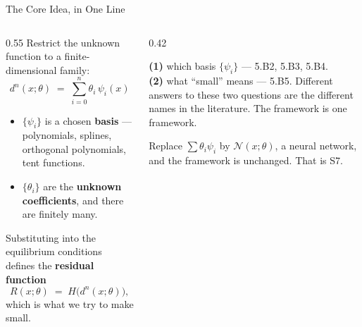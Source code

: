 \begin{frame}{The Core Idea, in One Line}
\begin{columns}[T]
\begin{column}{0.55\textwidth}
\small
Restrict the unknown function to a finite-dimensional family:
\[
  d^{n}(x;\theta)\;=\;\sum_{i=0}^{n}\theta_{i}\,\psi_{i}(x)
\]
\begin{itemize}\small
  \item $\{\psi_i\}$ is a chosen \textbf{basis} --- polynomials, splines, orthogonal polynomials, tent functions.
  \item $\{\theta_i\}$ are the \textbf{unknown coefficients}, and there are finitely many.
\end{itemize}
\medskip
Substituting into the equilibrium conditions defines the \textbf{residual function}
\[
  R(x;\theta)\;=\;H\big(d^{n}(x;\theta)\big),
\]
which is what we try to make small.
\end{column}
\begin{column}{0.42\textwidth}
\begin{conceptbox}[title=\textbf{Two separate choices}]\small
\textbf{(1)} which basis $\{\psi_i\}$ --- 5.B2, 5.B3, 5.B4.\\[1mm]
\textbf{(2)} what ``small'' means --- 5.B5.
\medskip
Different answers to these two questions are the different names in the literature. The framework is one framework.
\end{conceptbox}
\medskip
\begin{examplebox}\footnotesize
Replace $\sum\theta_i\psi_i$ by $\mathcal{N}(x;\theta)$, a neural network, and the framework is unchanged. That is S7.
\end{examplebox}
\end{column}
\end{columns}
\vspace{1mm}
\end{frame}

